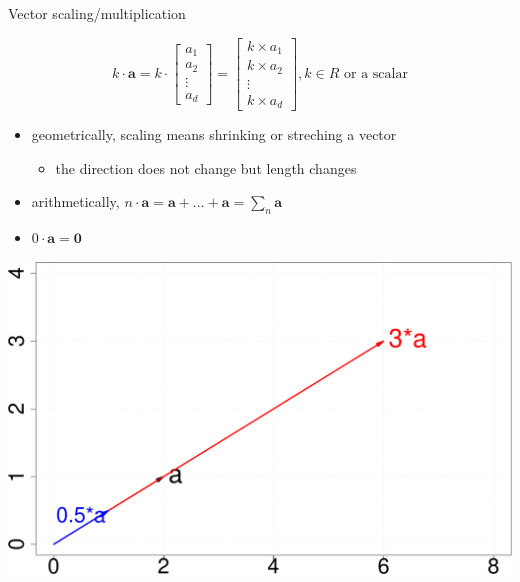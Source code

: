\documentclass[ignorenonframetext,]{beamer}
\providecommand{\tightlist}{%
  \setlength{\itemsep}{0pt}\setlength{\parskip}{0pt}}
\newcommand{\vv}[1]{\boldsymbol{#1}}
\begin{document}
\begin{frame}{Vector scaling/multiplication}
\protect\hypertarget{vector-scalingmultiplication}{}

\[k\cdot \vv{a} = k \cdot \begin{bmatrix}
           a_1 \\
           a_2 \\
           \vdots\\
           a_d
         \end{bmatrix} = \begin{bmatrix}
           k\times a_1 \\
           k\times a_2 \\
           \vdots\\
           k\times a_d
         \end{bmatrix}, k\in R \text{ or a scalar}\]

\begin{itemize}
\tightlist
\item
  geometrically, scaling means shrinking or streching a vector

  \begin{itemize}
  \tightlist
  \item
    the direction does not change but length changes
  \end{itemize}
\item
  arithmetically,
  \(n\cdot \vv{a} = \vv{a}+\ldots+ \vv{a}=\sum_n \vv{a}\)
\item
  \(0\cdot \vv{a} = \vv{0}\)
\end{itemize}

\begin{center}\includegraphics[width=0.45\linewidth]{math4ml_files/figure-beamer/unnamed-chunk-4-1} \end{center}

\end{frame}
\end{document}
